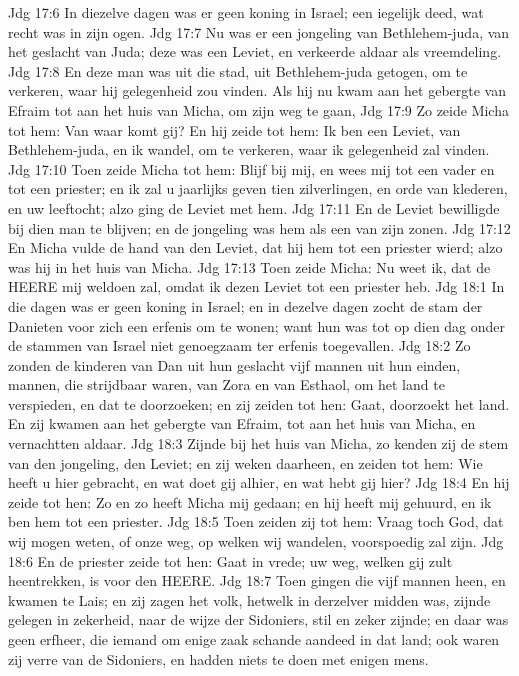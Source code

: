 Jdg 17:6  In diezelve dagen was er geen koning in Israel; een iegelijk deed, wat recht was in zijn ogen.
Jdg 17:7  Nu was er een jongeling van Bethlehem-juda, van het geslacht van Juda; deze was een Leviet, en verkeerde aldaar als vreemdeling.
Jdg 17:8  En deze man was uit die stad, uit Bethlehem-juda getogen, om te verkeren, waar hij gelegenheid zou vinden. Als hij nu kwam aan het gebergte van Efraim tot aan het huis van Micha, om zijn weg te gaan,
Jdg 17:9  Zo zeide Micha tot hem: Van waar komt gij? En hij zeide tot hem: Ik ben een Leviet, van Bethlehem-juda, en ik wandel, om te verkeren, waar ik gelegenheid zal vinden.
Jdg 17:10  Toen zeide Micha tot hem: Blijf bij mij, en wees mij tot een vader en tot een priester; en ik zal u jaarlijks geven tien zilverlingen, en orde van klederen, en uw leeftocht; alzo ging de Leviet met hem.
Jdg 17:11  En de Leviet bewilligde bij dien man te blijven; en de jongeling was hem als een van zijn zonen.
Jdg 17:12  En Micha vulde de hand van den Leviet, dat hij hem tot een priester wierd; alzo was hij in het huis van Micha.
Jdg 17:13  Toen zeide Micha: Nu weet ik, dat de HEERE mij weldoen zal, omdat ik dezen Leviet tot een priester heb.
Jdg 18:1  In die dagen was er geen koning in Israel; en in dezelve dagen zocht de stam der Danieten voor zich een erfenis om te wonen; want hun was tot op dien dag onder de stammen van Israel niet genoegzaam ter erfenis toegevallen.
Jdg 18:2  Zo zonden de kinderen van Dan uit hun geslacht vijf mannen uit hun einden, mannen, die strijdbaar waren, van Zora en van Esthaol, om het land te verspieden, en dat te doorzoeken; en zij zeiden tot hen: Gaat, doorzoekt het land. En zij kwamen aan het gebergte van Efraim, tot aan het huis van Micha, en vernachtten aldaar.
Jdg 18:3  Zijnde bij het huis van Micha, zo kenden zij de stem van den jongeling, den Leviet; en zij weken daarheen, en zeiden tot hem: Wie heeft u hier gebracht, en wat doet gij alhier, en wat hebt gij hier?
Jdg 18:4  En hij zeide tot hen: Zo en zo heeft Micha mij gedaan; en hij heeft mij gehuurd, en ik ben hem tot een priester.
Jdg 18:5  Toen zeiden zij tot hem: Vraag toch God, dat wij mogen weten, of onze weg, op welken wij wandelen, voorspoedig zal zijn.
Jdg 18:6  En de priester zeide tot hen: Gaat in vrede; uw weg, welken gij zult heentrekken, is voor den HEERE.
Jdg 18:7  Toen gingen die vijf mannen heen, en kwamen te Lais; en zij zagen het volk, hetwelk in derzelver midden was, zijnde gelegen in zekerheid, naar de wijze der Sidoniers, stil en zeker zijnde; en daar was geen erfheer, die iemand om enige zaak schande aandeed in dat land; ook waren zij verre van de Sidoniers, en hadden niets te doen met enigen mens.
